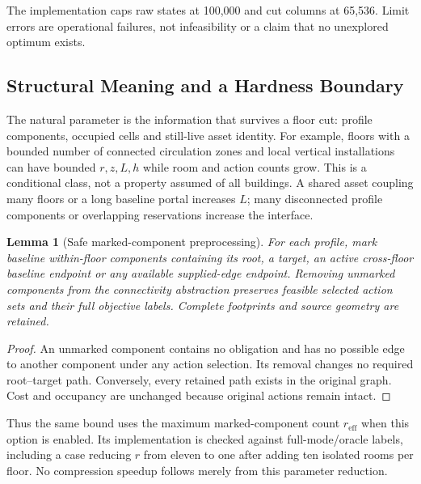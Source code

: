 \documentclass[conference]{IEEEtran}
\newtheorem{lemma}{Lemma}
\begin{document}
The implementation caps raw states at 100,000 and cut columns at 65,536. Limit errors are operational failures, not infeasibility or a claim that no unexplored optimum exists.


\subsection{Structural Meaning and a Hardness Boundary}
The natural parameter is the information that survives a floor cut: profile components, occupied cells and still-live asset identity. For example, floors with a bounded number of connected circulation zones and local vertical installations can have bounded $r,z,L,h$ while room and action counts grow. This is a conditional class, not a property assumed of all buildings. A shared asset coupling many floors or a long baseline portal increases $L$; many disconnected profile components or overlapping reservations increase the interface.

\begin{lemma}[Safe marked-component preprocessing]\label{lem:pruning}
For each profile, mark baseline within-floor components containing its root, a target, an active cross-floor baseline endpoint or any available supplied-edge endpoint. Removing unmarked components from the connectivity abstraction preserves feasible selected action sets and their full objective labels. Complete footprints and source geometry are retained.
\end{lemma}
\begin{proof}
An unmarked component contains no obligation and has no possible edge to another component under any action selection. Its removal changes no required root--target path. Conversely, every retained path exists in the original graph. Cost and occupancy are unchanged because original actions remain intact.
\end{proof}
Thus the same bound uses the maximum marked-component count $r_{\mathrm{eff}}$ when this option is enabled. Its implementation is checked against full-mode/oracle labels, including a case reducing $r$ from eleven to one after adding ten isolated rooms per floor. No compression speedup follows merely from this parameter reduction.
\end{document}
